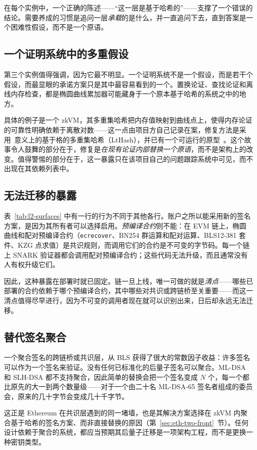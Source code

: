 在每个实例中，一个正确的陈述——“这一层是基于哈希的”——支撑了一个错误的结论。需要养成的习惯是追问一层\emph{承载}的是什么，并一直追问下去，直到答案是一个困难性假设，而不是一个原语。

\subsection{一个证明系统中的多重假设}
第三个实例值得强调，因为它最不明显。一个证明系统不是一个假设，而是若干个假设，而最显眼的承诺方案只是其中最容易看到的一个。置换论证、查找论证和离线内存检查，都是椭圆曲线累加器可能藏身于一个原本基于哈希的系统之中的地方。

具体的例子是一个 zkVM，其多重集哈希把内存值映射到曲线点上，使得内存论证的可靠性明确依赖于离散对数——这一点由项目方自己记录在案，修复方法是采用~\cite{zisklthash}意义上的基于格的多重集哈希（LtHash），并已有一个可运行的原型~\cite{ziren276}。这个故事令人鼓舞的部分在于，修复是\emph{在现有论证内部替换一个原语}，而不是架构上的改变。值得警惕的部分在于，这一暴露只在该项目自己的问题跟踪系统中可见，而不出现在其依赖列表中。

\subsection{无法迁移的暴露}
表~\ref{tab:l2-surfaces} 中有一行的行为不同于其他各行。账户之所以能采用新的签名方案，是因为其所有者可以选择启用。\emph{预编译合约}则不能：在 EVM 链上，椭圆曲线和配对预编译合约（\texttt{ecrecover}、BN254 群运算和配对运算、BLS12-381 套件、KZG 点求值）是共识规则，而调用它们的合约是不可变的字节码。每一个链上 SNARK 验证器都会调用配对预编译合约；这些代码无法升级，而且通常没有人有权升级它们。

因此，这种暴露在部署时就已固定。链一旦上线，唯一可做的就是\emph{清点}——哪些已部署的合约依赖于哪个预编译合约，其中哪些对共识或跨链桥至关重要——而这一清点值得尽早进行，因为不可变的调用者现在就可以识别出来，日后却永远无法迁移。

\subsection{替代签名聚合}
一个聚合签名的跨链桥或共识层，从 BLS 获得了很大的常数因子收益：许多签名可以作为一个签名来验证。没有任何已标准化的后量子签名可以聚合。ML-DSA 和 SLH-DSA 都不支持聚合，因此简单的替换会把一个签名变成 $N$ 个，每一个都比原先的大一到两个数量级——对于一个由二十名 ML-DSA-65 签名者组成的委员会，原来的几十字节会变成几十千字节。

这正是 Ethereum 在共识层遇到的同一堵墙，也是其解决方案选择在 zkVM 内聚合基于哈希的签名方案、而非直接替换的原因（第~\ref{sec:eth-two-front}~节）。任何设计依赖于聚合的系统，都应当预期其后量子迁移是一项架构工程，而不是更换一种密钥类型。

